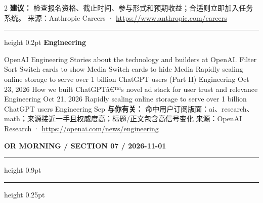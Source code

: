 \documentclass[10.5pt]{ctexart}
\begin{document}
\begin{multicols}{2}
\textbf{建议：} 检查报名资格、截止时间、参与形式和预期收益；合适则立即加入任务系统。
{\footnotesize\color{ormuted} 来源：Anthropic Careers · \url{https://www.anthropic.com/careers}}
\vspace{2mm}
\hrule height 0.2pt
\vspace{2mm}
{\large\bfseries Engineering}\par
OpenAI Engineering Stories about the technology and builders at OpenAI. Filter Sort Switch cards to show Media Switch cards to hide Media Rapidly scaling online storage to serve over 1 billion ChatGPT users (Part II) Engineering Oct 23, 2026 How we built ChatGPTâ€™s novel ad stack for user trust and relevance Engineering Oct 21, 2026 Rapidly scaling online storage to serve over 1 billion ChatGPT users Engineering Sep
\textbf{与你有关：} 命中用户订阅版面：ai、research、math；来源接近一手且权威度高；标题/正文包含高信号变化
{\footnotesize\color{ormuted} 来源：OpenAI Research · \url{https://openai.com/news/engineering}}
\end{multicols}
\newpage
{\small\bfseries OR MORNING / SECTION 07 / 2026-11-01}
\vspace{2mm}
\hrule height 0.9pt
\vspace{1.5mm}
\hrule height 0.25pt
\vspace{4mm}
\end{document}
